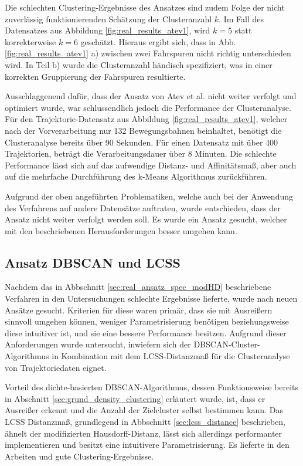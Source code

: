 Die schlechten Clustering-Ergebnisse des Ansatzes sind zudem Folge der nicht zuverlässig funktionierenden Schätzung
der Clusteranzahl $k$. Im Fall des Datensatzes aus Abbildung \ref{fig:real_results_atev1}, wird $k = 5$
statt korrekterweise $k = 6$ geschätzt. Hieraus ergibt sich, dass in Abb. \ref{fig:real_results_atev1} a)
zwischen zwei Fahrspuren nicht richtig unterschieden wird. In Teil b) wurde die Clusteranzahl händisch spezifiziert,
was in einer korrekten Gruppierung der Fahrspuren resultierte.

Ausschlaggenend dafür, dass der Ansatz von Atev et al. nicht weiter verfolgt und optimiert wurde, war schlussendlich
jedoch die Performance der Clusteranalyse. Für den Trajektorie-Datensatz aus Abbildung \ref{fig:real_results_atev1},
welcher nach der Vorverarbeitung nur 132 Bewegungsbahnen beinhaltet, benötigt die Clusteranalyse bereits über
90 Sekunden. Für einen Datensatz mit über 400 Trajektorien, beträgt die Verarbeitungsdauer über 8 Minuten.
Die schlechte Performance lässt sich auf das aufwendige Distanz- und Affinitätsmaß, aber auch auf die mehrfache
Durchführung des k-Means Algorithmus zurückführen.

Aufgrund der oben angeführten Problematiken, welche auch bei der Anwendung des Verfahrens auf andere Datensätze auftraten,
wurde entschieden, dass der Ansatz nicht weiter verfolgt werden soll.
Es wurde ein Ansatz gesucht, welcher mit den beschriebenen Herausforderungen besser umgehen kann.

\subsection{Ansatz DBSCAN und LCSS}
\label{sec:real_ansatz_dbscan_lcss}

Nachdem das in Abbschnitt \ref{sec:real_ansatz_spec_modHD} beschriebene Verfahren in
den Untersuchungen schlechte Ergebnisse lieferte, wurde nach neuen Ansätze gesucht.
Kriterien für diese waren primär, dass sie mit Ausreißern sinnvoll umgehen können, weniger Parametrisierung
benötigen beziehungsweise diese intuitiver ist, und sie eine bessere Performance besitzen.
Aufgrund dieser Anforderungen wurde untersucht, inwiefern sich der DBSCAN-Cluster-Algorithmus
in Kombination mit dem LCSS-Distanzmaß für die Clusteranalyse von Trajektoriedaten eignet.

Vorteil des dichte-basierten DBSCAN-Algorithmus, dessen Funktionsweise bereits in Abschnitt
\ref{sec:grund_density_clustering} erläutert wurde, ist, dass er Ausreißer erkennt und die Anzahl der
Zielcluster selbst bestimmen kann. Das LCSS Distanzmaß, grundlegend in Abbschnitt \ref{sec:lcss_distance}
beschrieben, ähnelt der modifizierten Hausdorff-Distanz, lässt sich allerdings performanter implementieren
und besitzt eine intuitivere Parametrisierung. Es lieferte in den Arbeiten \cite[]{Morris2011} und
\cite[]{Chen2014} gute Clustering-Ergebnisse.

